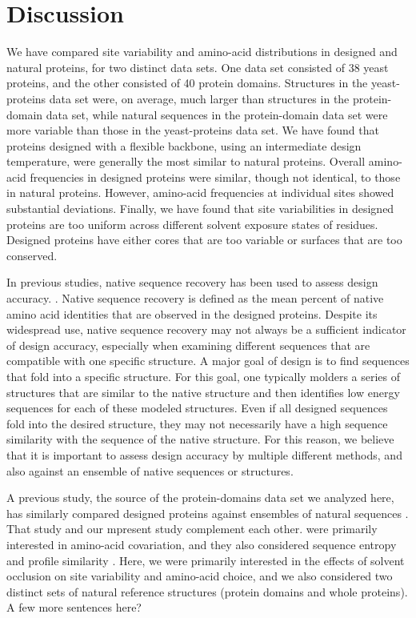 \documentclass[12pt]{article}
\begin{document}
\section{Discussion}

We have compared site variability and amino-acid distributions in designed and natural proteins, for two distinct data sets. One data set consisted of 38 yeast proteins, and the other consisted of 40 protein domains. Structures in the yeast-proteins data set were, on average, much larger than structures in the protein-domain data set, while natural sequences in the protein-domain data set were more variable than those in the yeast-proteins data set. We have found that proteins designed with a flexible backbone, using an intermediate design temperature, were generally the most similar to natural proteins. Overall amino-acid frequencies in designed proteins were similar, though not identical, to those in natural proteins. However, amino-acid frequencies at individual sites showed substantial deviations. Finally, we have found that site variabilities in designed proteins are too uniform across different solvent exposure states of residues. Designed proteins have either cores that are too variable or surfaces that are too conserved.

In previous studies, native sequence recovery has been used to assess design accuracy. \citep{Ganinza2012, Kuhlman2000}. Native sequence recovery is defined as the mean percent of native amino acid identities that are observed in the designed proteins. Despite its widespread use, native sequence recovery may not always be a sufficient indicator of design accuracy, especially when examining different sequences that are compatible with one specific structure. A major goal of design is to find sequences that fold into a specific structure. For this goal, one typically molders a series of structures that are similar to the native structure and then identifies low energy sequences for each of these modeled structures. Even if all designed sequences fold into the desired structure, they may not necessarily have a high sequence similarity with the sequence of the native structure. For this reason, we believe that it is important to assess design accuracy by multiple different methods, and also against an ensemble of native sequences or structures.

A previous study, the source of the protein-domains data set we analyzed here, has similarly compared designed proteins against ensembles of natural sequences \citep{OllikainenKortemme}. That study and our mpresent study complement each other. \citet{OllikainenKortemme} were primarily interested in amino-acid covariation, and they also considered sequence entropy and profile similarity \citep{Yona2002}. Here, we were primarily interested in the effects of solvent occlusion on site variability and amino-acid choice, and we also considered two distinct sets of natural reference structures (protein domains and whole proteins).  {\color{green}A few more sentences here?}
\end{document}
